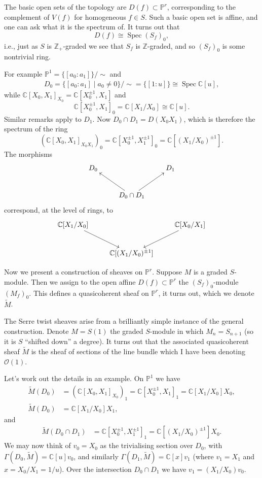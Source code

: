 \documentclass[12pt]{article}
\theoremstyle{plain}
\theoremstyle{definition}
\numberwithin{equation}{section}
\DeclareMathOperator{\spec}{Spec}
\newcommand{\C}{\mathbb{C}}
\newcommand{\Z}{\mathbb{Z}}
\newcommand{\bbP}{\mathbb{P}}
\newcommand{\OO}{\mathcal{O}}
\begin{document}
The basic open sets of the topology are $D(f) \subset \bbP^r$, corresponding to the complement of $V(f)$ for homogeneous $f \in S$. Such a basic open set is affine, and one can ask what it is the spectrum of. It turns out that
\[
D(f) \cong \spec(S_f)_0,
\]
i.e., just as $S$ is $\Z_+$-graded we see that $S_f$ is $\Z$-graded, and so $(S_f)_0$ is some nontrivial ring.

For example $\bbP^1 = \{[a_0 : a_1]\} / \sim$ and
\begin{align*}
D_0 = \{[a_0 : a_1] \mid a_0 \neq 0\} / \sim = \{[1 : u]\} \cong \spec \C[u],
\end{align*}
while $\C[X_0, X_1]_{X_0} = \C[X_0^{\pm 1}, X_1]$ and
\[
\C[X_0^{\pm 1}, X_1]_0 = \C[X_1 / X_0] \cong \C[u].
\]
Similar remarks apply to $D_1$. Now $D_0 \cap D_1 = D(X_0X_1)$, which is therefore the spectrum of the ring
\[
(\C[X_0, X_1]_{X_0X_1})_0 = \C[X_0^{\pm 1}, X_1^{\pm 1}]_0 = \C[(X_1 / X_0)^{\pm 1}].
\]
The morphisms
\begin{align*}
\xymatrix{
D_0 & & D_1 \\
%
& D_0 \cap D_1 \ar@{->}[ul] \ar@{->}[ur] & \\
}
\end{align*}
correspond, at the level of rings, to
\begin{align*}
\xymatrix{
\C[X_1 / X_0] \ar@{->}[dr] & & \C[X_0 / X_1] \ar@{->}[dl] \\
%
& \C[(X_1 / X_0)^{\pm 1}] & \\
}
\end{align*}

Now we present a construction of sheaves on $\bbP^r$. Suppose $M$ is a graded $S$-module. Then we assign to the open affine $D(f) \subset \bbP^r$ the $(S_f)_0$-module $(M_f)_0$. This defines a quasicoherent sheaf on $\bbP^r$, it turns out, which we denote $\widetilde{M}$.

The Serre twist sheaves arise from a brilliantly simple instance of the general construction. Denote $M = S(1)$ the graded $S$-module in which $M_n = S_{n+1}$ (so it is $S$ ``shifted down'' a degree). It turns out that the associated quasicoherent sheaf $\widetilde M$ is the sheaf of sections of the line bundle which I have been denoting $\OO(1)$.

Let's work out the details in an example. On $\bbP^1$ we have
\begin{align*}
\widetilde{M}(D_0) &= (\C[X_0, X_1]_{X_0})_1 = \C[X_0^{\pm 1}, X_1]_1 = \C[X_1 / X_0] X_0, \\
%
\widetilde{M}(D_0) &= \C[X_1 / X_0] X_1,
\end{align*}
and
\begin{align*}
\widetilde{M}(D_0 \cap D_1) &= \C[X_0^{\pm 1}, X_1^{\pm 1}]_1 = \C[(X_1 / X_0)^{\pm 1}] X_0.
\end{align*}
We may now think of $v_0 = X_0$ as the trivialising section over $D_0$, with $\Gamma(D_0, \widetilde{M}) = \C[u]v_0$, and similarly $\Gamma(D_1, \widetilde{M}) = \C[x] v_1$ (where $v_1 = X_1$ and $x = X_0 / X_1 = 1/u$). Over the intersection $D_0 \cap D_1$ we have $v_1 = (X_1 / X_0) v_0$.
\end{document}
